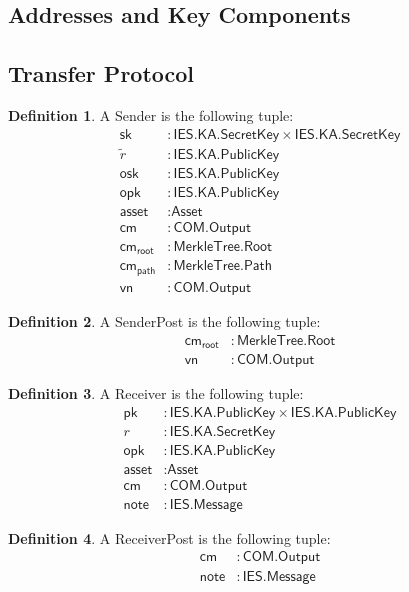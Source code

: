 \documentclass[a4paper]{article}
\newcommand{\lsubsection}[2]{\def\sectionlabel{#2} \subsection{#1}\label{sec:#2}}
\theoremstyle{definition}
\newtheorem{definition}{Definition}[subsection]
\newcommand{\Asset}{{\textsf{Asset}}}
\newcommand{\COM}{{\textsf{COM}}}
\newcommand{\IES}{{\textsf{IES}}}
\newcommand{\KA}{{\textsf{KA}}}
\newcommand{\MerkleTree}{{\textsf{MerkleTree}}}
\newcommand{\Message}{{\textsf{Message}}}
\newcommand{\Output}{{\textsf{Output}}}
\newcommand{\PATH}{{\textsf{path}}}
\newcommand{\Path}{{\textsf{Path}}}
\newcommand{\PublicKey}{{\textsf{PublicKey}}}
\newcommand{\ROOT}{{\textsf{root}}}
\newcommand{\ReceiverPost}{{\textsf{ReceiverPost}}}
\newcommand{\Receiver}{{\textsf{Receiver}}}
\newcommand{\Root}{{\textsf{Root}}}
\newcommand{\SecretKey}{{\textsf{SecretKey}}}
\newcommand{\SenderPost}{{\textsf{SenderPost}}}
\newcommand{\Sender}{{\textsf{Sender}}}
\newcommand{\Transfer}{{\textsf{Transfer}}}
\newcommand{\asset}{{\textsf{asset}}}
\newcommand{\cm}{{\textsf{cm}}}
\newcommand{\note}{{\textsf{note}}}
\newcommand{\opk}{{\textsf{opk}}}
\newcommand{\osk}{{\textsf{osk}}}
\newcommand{\pk}{{\textsf{pk}}}
\newcommand{\sk}{{\textsf{sk}}}
\newcommand{\vn}{{\textsf{vn}}}
\begin{document}
\lsubsection{Addresses and Key Components}{addresses-and-key-components}

\lsubsection{\Transfer{} Protocol}{transfer-protocol}

\begin{definition}
    A \Sender{} is the following tuple:
    \begin{align*}
        \sk       &: \IES.\KA.\SecretKey \times \IES.\KA.\SecretKey \\
        \tilde{r} &: \IES.\KA.\PublicKey \\
        \osk      &: \IES.\KA.\PublicKey \\
        \opk      &: \IES.\KA.\PublicKey \\
        \asset    &: \Asset \\
        \cm       &: \COM.\Output \\
        \cm_\ROOT &: \MerkleTree.\Root \\
        \cm_\PATH &: \MerkleTree.\Path \\
        \vn       &: \COM.\Output
    \end{align*}
\end{definition}

\begin{definition}
    A \SenderPost{} is the following tuple:
    \begin{align*}
        \cm_\ROOT &: \MerkleTree.\Root \\
        \vn       &: \COM.\Output
    \end{align*}
\end{definition}

\begin{definition}
    A \Receiver{} is the following tuple:
    \begin{align*}
        \pk       &: \IES.\KA.\PublicKey \times \IES.\KA.\PublicKey \\
        r         &: \IES.\KA.\SecretKey \\
        \opk      &: \IES.\KA.\PublicKey \\
        \asset    &: \Asset \\
        \cm       &: \COM.\Output \\
        \note     &: \IES.\Message
    \end{align*}
\end{definition}

\begin{definition}
    A \ReceiverPost{} is the following tuple:
    \begin{align*}
        \cm       &: \COM.\Output \\
        \note     &: \IES.\Message
    \end{align*}
\end{definition}
\end{document}

